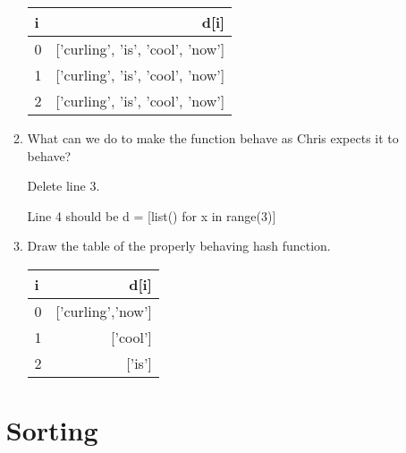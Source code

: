 \documentclass[11pt]{article}
\newenvironment{answer}{\large\lstset{basicstyle=\large}\color{white}}{}
\newenvironment{answer}{\large\lstset{basicstyle=\large}\color{red}}{}
\begin{document}
\begin{enumerate}
\begin{enumerate}
\begin{answer}
            \begin{tabular}{l | r}
    
        	i & d[i] \\ \hline
    		0 & ['curling', 'is', 'cool', 'now'] \\ 
    		1 & ['curling', 'is', 'cool', 'now'] \\
    		2 & ['curling', 'is', 'cool', 'now'] \\
    
    	    \end{tabular}
        \end{answer}

    \item What can we do to make the function behave as Chris expects it to
          behave?

        \begin{answer}
        Delete line 3.

        Line 4 should be d = [list() for x in range(3)]
        \end{answer}

    \item Draw the table of the properly behaving hash function.
        
        \begin{answer}
            \begin{tabular}{l | r}
    
        	i & d[i] \\ \hline
            0 & ['curling','now'] \\ 
            1 & ['cool'] \\
            2 & ['is'] \\
    
    	    \end{tabular}
        \end{answer}
    \end{enumerate}


\section*{Sorting}


\end{enumerate}
\end{document}
